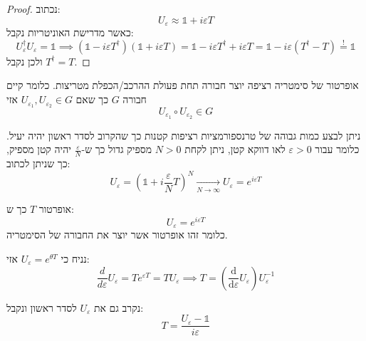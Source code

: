 \documentclass{tstextbook}
\begin{document}
\begin{proof}
נכתוב:
$$U_{\varepsilon}\approx \mathbb{1} +i\varepsilon T$$
כאשר מדרישת האוניטריות נקבל:
$$U_{\varepsilon}^{\dagger}U_{\varepsilon}=\mathbb{1} \implies \left( \mathbb{1} -i\varepsilon T^{\dagger} \right)\left( \mathbb{1} +i\varepsilon T \right)=\mathbb{1} -i\varepsilon T^{\dagger}+i\varepsilon T=\mathbb{1} -i\varepsilon\left( T^{\dagger}-T \right)\overset{!}{=}  \mathbb{1} $$
ולכן נקבל \(T^{\dagger}=T\).

\end{proof}
\begin{proposition}
אופרטור של סימטריה רציפה יוצר חבורה תחת פעולת ההרכב/הכפלת מטריצות. כלומר קיים חבורה \(G\) כך שאם \(U_{\varepsilon_{1}},U_{\varepsilon_{2}}\in G\) אזי
$$U_{\varepsilon_{1}}\circ U_{\varepsilon_{2}}\in G$$

\end{proposition}
\begin{corollary}
ניתן לבצע כמות גבוהה של טרנספורמציות רציפות קטנות כך שהקרוב לסדר ראשון יהיה יעיל. כלומר עבור \(\varepsilon> 0\) לאו דווקא קטן, ניתן לקחת \(N>0\) מספיק גדול כך ש-\(\frac{\varepsilon}{N}\) יהיה קטן מספיק, כך שניתן לכתוב:
$$U_{\varepsilon} = \left( \mathbb{1} +i \frac{\varepsilon}{N}T \right)^{N}\xrightarrow[N\to \infty]{} U_{\varepsilon}=e^{ i\varepsilon T }$$

\end{corollary}
\begin{definition}
אופרטור \(T\) כך ש:
$$U_{\varepsilon}=e^{ i\varepsilon T }$$
כלומר זהו אופרטור אשר יוצר את החבורה של הסימטריה.

\end{definition}
\begin{proposition}
נניח כי \(U_{\varepsilon}=e^{ \theta T }\) אזי:
$$\frac{d}{d\varepsilon}U_{\varepsilon}=Te^{ \varepsilon T }=TU_{\varepsilon}\implies T=\left( \frac{\mathrm{d} }{\mathrm{d} \varepsilon} U_{\varepsilon} \right)U_{\varepsilon}^{-1}$$

\end{proposition}
\begin{proposition}
נקרב גם את \(U_{\varepsilon}\) לסדר ראשון ונקבל:
$$T= \frac{U_{\varepsilon}-\mathbb{1} }{i\varepsilon}$$

\end{proposition}
\end{document}
